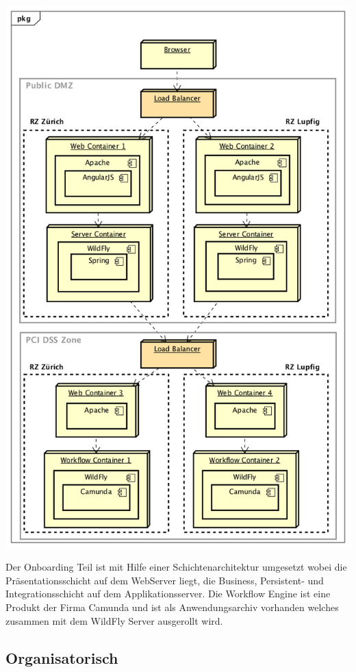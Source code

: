 \begin{center}
	\includegraphics[scale=0.6]{CurrentDeployment.png}
\end{center}
Der Onboarding Teil ist mit Hilfe einer Schichtenarchitektur umgesetzt wobei die Präsentationsschicht auf dem WebServer liegt, die Business, Persistent- und Integrationsschicht auf dem Applikationsserver. Die Workflow Engine ist eine Produkt der Firma Camunda und ist als Anwendungsarchiv vorhanden welches zusammen mit dem WildFly Server ausgerollt wird.

\subsection{Organisatorisch}

